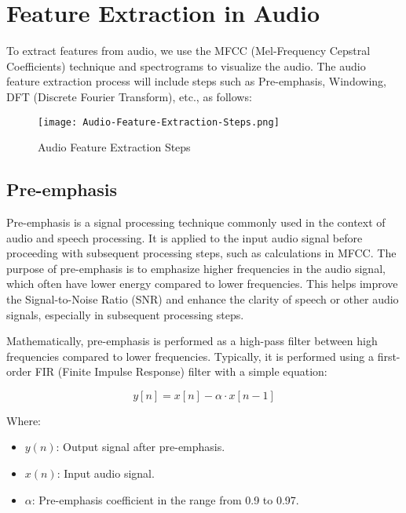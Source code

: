 \section{Feature Extraction in Audio}

To extract features from audio, we use the MFCC
(Mel-Frequency Cepstral Coefficients) technique and
spectrograms to visualize the audio. The audio feature
extraction process will include steps such as Pre-emphasis,
Windowing, DFT (Discrete Fourier Transform), etc.\cite{hossan2011novel}, as follows:

\vspace{-1em}
\begin{figure}[H]
    \centering
    \texttt{[image: Audio-Feature-Extraction-Steps.png]}
    \caption{Audio Feature Extraction Steps}
    \label{fig:audio-feature-extraction-steps}
\end{figure}
\vspace{-1em}

\subsection{Pre-emphasis}

Pre-emphasis is a signal processing technique commonly used
in the context of audio and speech processing. It is applied
to the input audio signal before proceeding with subsequent
processing steps, such as calculations in MFCC. The purpose of
pre-emphasis is to emphasize higher frequencies in the audio
signal, which often have lower energy compared to lower
frequencies. This helps improve the Signal-to-Noise Ratio
(SNR) and enhance the clarity of speech or other audio
signals, especially in subsequent processing steps.

Mathematically, pre-emphasis is performed as a high-pass
filter between high frequencies compared to lower frequencies.
Typically, it is performed using a first-order FIR
(Finite Impulse Response) filter with a simple equation:

\vspace{-1em}
\begin{equation}
    y[n] = x[n] - \alpha \cdot x[n-1]
\end{equation}
\vspace{-1em}

Where:
\begin{itemize}
    \item $y(n)$: Output signal after pre-emphasis.
    \item $x(n)$: Input audio signal.
    \item $\alpha$: Pre-emphasis coefficient in the range from 0.9 to 0.97.
\end{itemize}

